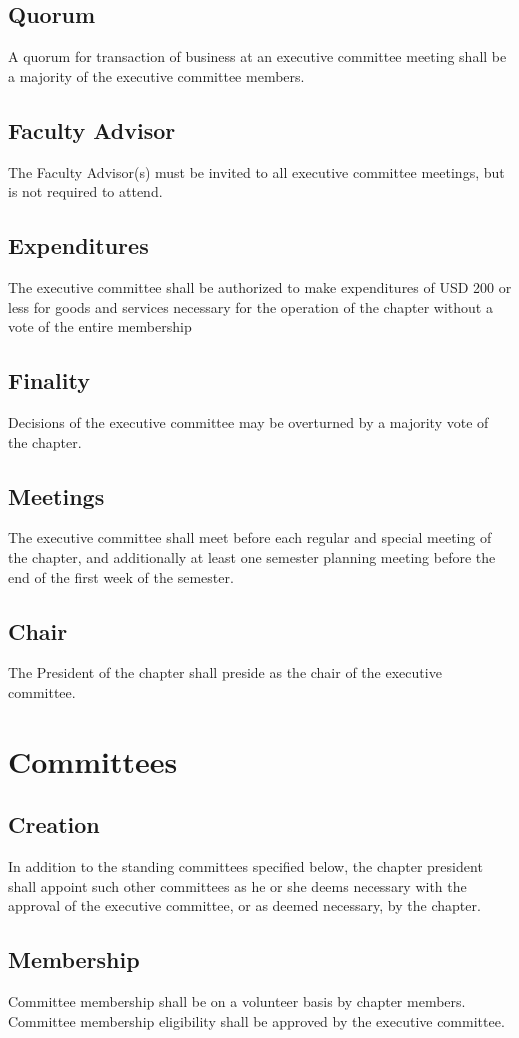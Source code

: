 \documentclass[10pt, oneside]{article}
\begin{document}
\subsection{Quorum}
A quorum for transaction of business at an executive committee meeting shall be a majority of the executive committee members.
\subsection{Faculty Advisor}
The Faculty Advisor(s) must be invited to all executive committee meetings, but is not required to attend.
\subsection{Expenditures}
The executive committee shall be authorized to make expenditures of USD 200 or less for goods and services necessary for the operation of the chapter without a vote of the entire membership
\subsection{Finality}
Decisions of the executive committee may be overturned by a majority vote of the chapter.
\subsection{Meetings}
The executive committee shall meet before each regular and special meeting of the chapter, and additionally at least one semester planning meeting before the end of the first week of the semester.
\subsection{Chair}
The President of the chapter shall preside as the chair of the executive committee.

\section{Committees}
\subsection{Creation}
In addition to the standing committees specified below, the chapter president shall appoint such other committees as he or she deems necessary with the approval of the executive committee, or as deemed necessary, by the chapter.
\subsection{Membership}
Committee membership shall be on a volunteer basis by chapter members. Committee membership eligibility shall be approved by the executive committee.
\end{document}
